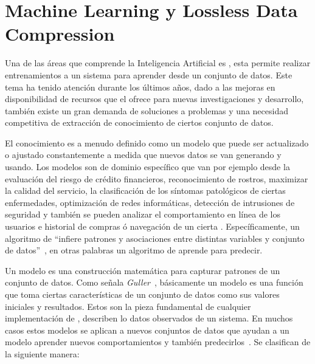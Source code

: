 

\chapter[Machine Learning y Lossless Data Compression]{Machine Learning y Lossless Data Compression}\label{ch:Compresion-Machine-Learning}


Una de las áreas que comprende la Inteligencia Artificial es \machinelearning, esta permite realizar entrenamientos a un sistema para aprender desde un conjunto de datos. Este tema ha tenido atención durante los últimos años, dado a las mejoras en disponibilidad de recursos que el \cloudcomputing ofrece para nuevas investigaciones y desarrollo, también existe un gran demanda de soluciones a problemas y una necesidad competitiva de extracción de conocimiento de ciertos conjunto de datos.

El conocimiento es a menudo definido como un modelo que puede ser actualizado o ajustado constantemente a medida que nuevos datos se van generando y usando. Los modelos son  de dominio específico que van por ejemplo desde la evaluación del riesgo de crédito financieros, reconocimiento de rostros, maximizar la calidad del servicio, la clasificación de los síntomas patológicos de ciertas enfermedades, optimización de redes informáticas, detección de intrusiones de seguridad y también se pueden analizar el comportamiento en línea de los usuarios e historial de compras ó navegación  de un cierta \webs. Específicamente, un algoritmo de \machinelearning ``infiere patrones y asociaciones entre distintas variables y conjunto de datos''~\cite[capítulo 8]{guller2015big}, en otras palabras un algoritmo de \machinelearning aprende para predecir. 


Un modelo es una construcción matemática para capturar patrones de un conjunto de datos. Como señala \emph{Guller}~\MLGuller, básicamente un modelo es una función que toma ciertas características de un conjunto de datos como sus valores iniciales y resultados.  Estos son la pieza fundamental de cualquier implementación de \machinelearning, describen lo datos observados de un sistema. En muchos casos estos modelos se aplican a nuevos conjuntos de datos  que ayudan a un modelo aprender nuevos comportamientos y también predecirlos~\MLPDASunila. Se clasifican de la siguiente manera:

